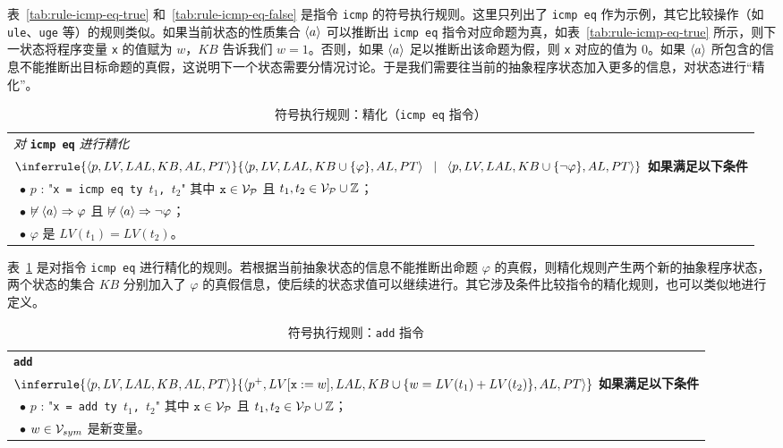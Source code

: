 表~\ref{tab:rule-icmp-eq-true} 和~\ref{tab:rule-icmp-eq-false} 是指令 \verb|icmp| 的符号执行规则。这里只列出了 \verb|icmp eq| 作为示例，其它比较操作（如 \verb|ule|、\verb|uge| 等）的规则类似。如果当前状态的性质集合 $\langle a\rangle$ 可以推断出 \verb|icmp eq| 指令对应命题为真，如表~\ref{tab:rule-icmp-eq-true} 所示，则下一状态将程序变量 \verb|x| 的值赋为 $w$，$KB$ 告诉我们 $w=1$。否则，如果 $\langle a\rangle$ 足以推断出该命题为假，则 \verb|x| 对应的值为 0。如果 $\langle a\rangle$ 所包含的信息不能推断出目标命题的真假，这说明下一个状态需要分情况讨论。于是我们需要往当前的抽象程序状态加入更多的信息，对状态进行“精化”。

\begin{table}[htbp]
\caption{符号执行规则：精化（\texttt{icmp eq} 指令）}
\label{tab:rule-refine-icmp-eq}
\begin{tabularx}{\textwidth}{|X|}
\hline
\emph{对} \textbf{\texttt{icmp eq}} \emph{进行精化}  \\
{\centering $
\inferrule
   {\lb p, LV, LAL, KB, AL, PT\rb}
   {\lb p, LV, LAL, KB\cup\{\varphi\}, AL, PT\rb \;\;\mid\;\; \lb p, LV, LAL, KB\cup\{\lnot\varphi\}, AL, PT\rb}
$ \\}
\textbf{如果满足以下条件} \\
~$\bullet$ $p$ : "\texttt{x = icmp eq ty $t_1$, $t_2$}" 其中 $\texttt{x}\in\mathcal{V}_{\mathcal{P}}$ 且 $t_1,t_2\in\mathcal{V}_{\mathcal{P}}\cup\mathbb{Z}$； \\
~$\bullet$ $\not\vDash \langle a\rangle \Rightarrow \varphi$ 且 $\not\vDash \langle a\rangle \Rightarrow \lnot\varphi$； \\
~$\bullet$ $\varphi$ 是 $LV(t_1) = LV(t_2)$。 \\
\hline
\end{tabularx}
\end{table}

表~\ref{tab:rule-refine-icmp-eq} 是对指令 \verb|icmp eq| 进行精化的规则。若根据当前抽象状态的信息不能推断出命题 $\varphi$ 的真假，则精化规则产生两个新的抽象程序状态，两个状态的集合 $KB$ 分别加入了 $\varphi$ 的真假信息，使后续的状态求值可以继续进行。其它涉及条件比较指令的精化规则，也可以类似地进行定义。

\begin{table}[htbp]
\caption{符号执行规则：\texttt{add} 指令}
\label{tab:rule-add}
\begin{tabularx}{\textwidth}{|X|}
\hline
\textbf{\texttt{add}} \\
{\centering $
\inferrule
   {\lb p, LV, LAL, KB, AL, PT\rb}
   {\lb p^+, LV[\texttt{x} := w], LAL, KB\cup\{w= LV(t_1) + LV(t_2)\}, AL, PT\rb} 
$ \\}
\textbf{如果满足以下条件} \\
~$\bullet$ $p$ : "\texttt{x = add ty $t_1$, $t_2$}" 其中 $\texttt{x}\in\mathcal{V}_{\mathcal{P}}$ 且 $t_1,t_2\in\mathcal{V}_{\mathcal{P}}\cup\mathbb{Z}$； \\
~$\bullet$ $w\in\mathcal{V}_{sym}$ 是新变量。 \\
\hline
\end{tabularx}
\end{table}

